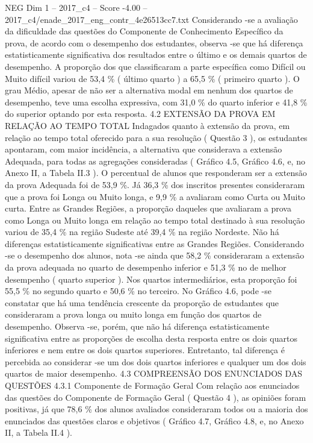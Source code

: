 \begin{textsample}{NEG Dim 1 – 2017\_c4 – Score -4.00 – 2017\_c4/enade\_2017\_eng\_contr\_4e26513cc7.txt}
Considerando -se a avaliação da dificuldade das questões do Componente de Conhecimento Específico da prova, de acordo com o desempenho dos estudantes, observa -se que há diferença estatisticamente significativa dos resultados entre o último e os demais quartos de desempenho.
A proporção dos que classificaram a parte específica como Difícil ou Muito difícil variou de 53,4 \% ( último quarto ) a 65,5 \% ( primeiro quarto ).
O grau Médio, apesar de não ser a alternativa modal em nenhum dos quartos de desempenho, teve uma escolha expressiva, com 31,0 \% do quarto inferior e 41,8 \% do superior optando por esta resposta. 4.2 EXTENSÃO DA PROVA EM RELAÇÃO AO TEMPO TOTAL Indagados quanto à extensão da prova, em relação ao tempo total oferecido para a sua resolução ( Questão 3 ), os estudantes apontaram, com maior incidência, a alternativa que considerava a extensão Adequada, para todas as agregações consideradas ( Gráfico 4.5, Gráfico 4.6, e, no Anexo II, a Tabela II.3 ).
O percentual de alunos que responderam ser a extensão da prova Adequada foi de 53,9 \%.
Já 36,3 \% dos inscritos presentes consideraram que a prova foi Longa ou Muito longa, e 9,9 \% a avaliaram como Curta ou Muito curta.
Entre as Grandes Regiões, a proporção daqueles que avaliaram a prova como Longa ou Muito longa em relação ao tempo total destinado à sua resolução variou de 35,4 \% na região Sudeste até 39,4 \% na região Nordeste.
Não há diferenças estatisticamente significativas entre as Grandes Regiões.
Considerando -se o desempenho dos alunos, nota -se ainda que 58,2 \% consideraram a extensão da prova adequada no quarto de desempenho inferior e 51,3 \% no de melhor desempenho ( quarto superior ).
Nos quartos intermediários, esta proporção foi 55,5 \% no segundo quarto e 50,6 \% no terceiro.
No Gráfico 4.6, pode -se constatar que há uma tendência crescente da proporção de estudantes que consideraram a prova longa ou muito longa em função dos quartos de desempenho.
Observa -se, porém, que não há diferença estatisticamente significativa entre as proporções de escolha desta resposta entre os dois quartos inferiores e nem entre os dois quartos superiores.
Entretanto, tal diferença é percebida ao considerar -se um dos dois quartos inferiores e qualquer um dos dois quartos de maior desempenho. 4.3 COMPREENSÃO DOS ENUNCIADOS DAS QUESTÕES 4.3.1 Componente de Formação Geral Com relação aos enunciados das questões do Componente de Formação Geral ( Questão 4 ), as opiniões foram positivas, já que 78,6 \% dos alunos avaliados consideraram todos ou a maioria dos enunciados das questões claros e objetivos ( Gráfico 4.7, Gráfico 4.8, e, no Anexo II, a Tabela II.4 ).

\end{textsample}
